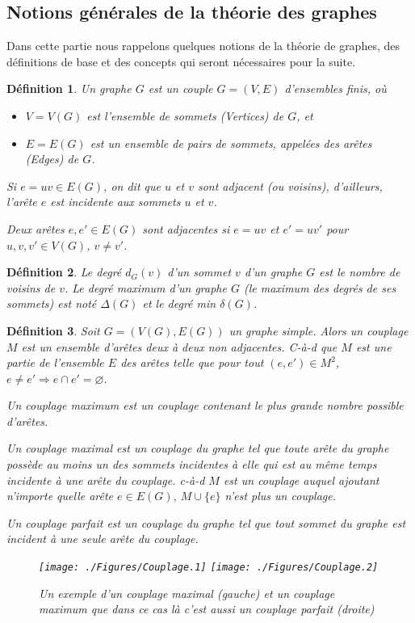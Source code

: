 \documentclass[10pt,a4paper]{article}
\newtheorem{definition}{Définition}
\begin{document}
\subsection{Notions générales de la théorie des graphes}

Dans cette partie nous rappelons quelques notions de la théorie de graphes,  des définitions de base et des concepts qui seront nécessaires pour la suite. 

\begin{definition}
Un \emph{graphe} $G$ est un couple $G = (V,E)$ d'ensembles finis, où 
\begin{itemize}
\item $V=V(G)$ est l'ensemble de \emph{sommets (Vertices)} de $G$, et
\item $E=E(G)$ est un ensemble de pairs de sommets, appelées des \emph{arêtes (Edges)} de $G$.
\end{itemize}
Si $e = uv \in E(G)$, on dit que $u$ et $v$ sont \emph{adjacent} (ou \emph{voisins}), d'ailleurs, l'arête $e$ est \emph{incidente} aux sommets $u$ et $v$.

Deux arêtes $e,e'\in E(G)$ sont \emph{adjacentes} si $e=uv$ et $e'=uv'$ pour $u,v,v'\in V(G)$, $v\ne v'$.
\end{definition}
  

\begin{definition}
Le \emph{degré} $d_{G}(v)$ d'un sommet $v$ d'un graphe $G$ est le nombre de voisins de $v$. Le degré maximum d'un graphe $G$ (le maximum des degrés de ses sommets) est noté $\Delta(G)$ et le degré min $\delta(G)$.
\end{definition}

\begin{definition}
Soit $G=(V(G),E(G))$ un graphe simple. Alors un \emph{couplage} $M$ est un ensemble d'arêtes deux à deux non adjacentes. C-à-d que $M$ est une partie de l'ensemble $E$ des arêtes telle que pour tout $(e,e') \in M^2$, $e \neq e' \Rightarrow e \cap e' = \varnothing$.

Un \emph{couplage maximum} est un couplage contenant le plus grande nombre possible d'arêtes.

Un \emph{couplage maximal} est un couplage du graphe tel que toute arête du graphe possède au moins un des sommets incidentes à elle qui est au même temps incidente à une arête du couplage. c-à-d $M$ est un couplage auquel ajoutant n'importe quelle arête $e \in E(G)$, $M \cup \{e\}$ n'est plus un couplage.

Un \emph{couplage parfait} est un couplage du graphe tel que tout sommet du graphe est incident à une seule arête du couplage.

\begin{figure}[ht]
\centerline{
\texttt{[image: ./Figures/Couplage.1]}
\hfil
\texttt{[image: ./Figures/Couplage.2]}
}
\caption{Un exemple d'un couplage maximal (gauche) et un couplage maximum que dans ce cas là c'est aussi un couplage parfait (droite)}
\label{fig:Coup}
\end{figure}

\end{definition}
\end{document}
